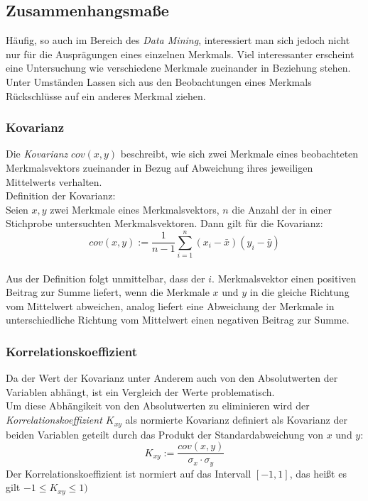 \documentclass[fontsize=11pt]{scrartcl}
\begin{document}
                \subsection{Zusammenhangsmaße}
                    Häufig, so auch im Bereich des \emph{Data Mining}, interessiert man sich jedoch nicht nur für die Ausprägungen eines einzelnen Merkmals. Viel interessanter erscheint eine Untersuchung wie verschiedene Merkmale zueinander in Beziehung stehen. Unter Umständen Lassen sich aus den Beobachtungen eines Merkmals Rückschlüsse auf ein anderes Merkmal ziehen.
                    \subsubsection{Kovarianz}
                        Die \emph{Kovarianz} $cov(x,y)$ beschreibt, wie sich zwei Merkmale eines beobachteten Merkmalsvektors zueinander in Bezug auf Abweichung ihres jeweiligen Mittelwerts verhalten. \cite{ertel2016}\\
                        Definition der Kovarianz:\\
                        Seien $x,y$ zwei Merkmale eines Merkmalsvektors, $n$ die Anzahl der in einer Stichprobe untersuchten Merkmalsvektoren. Dann gilt für die Kovarianz:
                        $$
                            cov(x,y) := \frac{1}{n-1}\sum_{i=1}^n(x_i - \bar{x})(y_i - \bar{y})
                        $$ \cite{kohn2005}\\
                        Aus der Definition folgt unmittelbar, dass der $i$. Merkmalsvektor einen positiven Beitrag zur Summe liefert, wenn die Merkmale $x$ und $y$ in die gleiche Richtung vom Mittelwert abweichen, analog liefert eine Abweichung der Merkmale in unterschiedliche Richtung vom Mittelwert einen negativen Beitrag zur Summe. \cite{ertel2016}

                    \subsubsection{Korrelationskoeffizient}
                        Da der Wert der Kovarianz unter Anderem auch von den Absolutwerten der Variablen abhängt, ist ein Vergleich der Werte problematisch.
                        \cite{ertel2016} \\
                        Um diese Abhängikeit von den Absolutwerten zu eliminieren wird der \emph{Korrelationskoeffizient $K_{xy}$} als normierte Kovarianz definiert als Kovarianz der beiden Variablen geteilt durch das Produkt der Standardabweichung von $x$ und $y$:
                        $$
                            K_{xy} := \frac{cov(x,y)}{\sigma_x \cdot \sigma_y} 
                        $$
                        Der Korrelationskoeffizient ist normiert auf das Intervall $[-1,1]$, das heißt es gilt $-1 \leq K_{xy} \leq 1)$
                        \cite{kohn2005}
\end{document}
